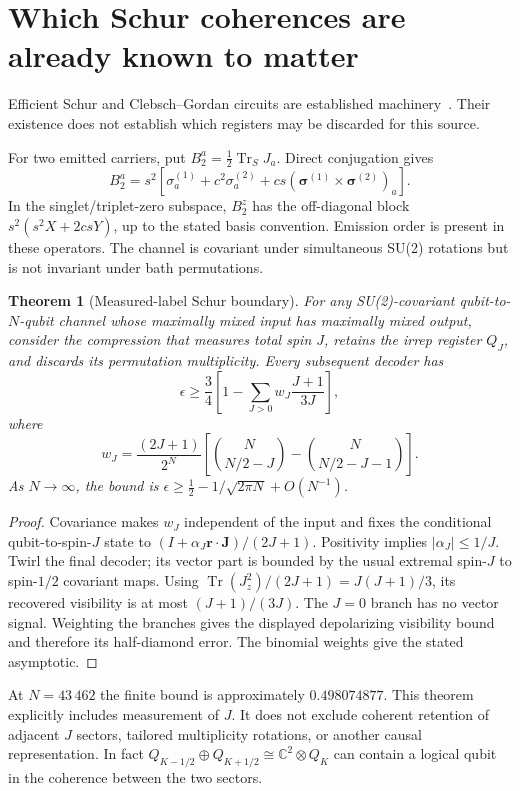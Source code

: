 \documentclass[11pt]{article}
\newtheorem{theorem}{Theorem}
\newcommand{\Tr}{\operatorname{Tr}}
\begin{document}
\section{Which Schur coherences are already known to matter}

Efficient Schur and Clebsch--Gordan circuits are established
machinery~\cite{bacon}. Their existence does not establish which registers may
be discarded for this source.

For two emitted carriers, put $B_2^a=\tfrac12\Tr_S J_a$. Direct conjugation gives
\begin{equation}
 B_2^a=s^2\left[\sigma_a^{(1)}+c^2\sigma_a^{(2)}
       +cs(\boldsymbol\sigma^{(1)}\times\boldsymbol\sigma^{(2)})_a\right].
 \label{eq:B2}
\end{equation}
In the singlet/triplet-zero subspace, $B_2^z$ has the off-diagonal block
$s^2(s^2X+2csY)$, up to the stated basis convention. Emission order is present
in these operators. The channel is covariant under simultaneous SU(2)
rotations but is not invariant under bath permutations.

\begin{theorem}[Measured-label Schur boundary]
For any SU(2)-covariant qubit-to-$N$-qubit channel whose maximally mixed input
has maximally mixed output, consider the compression that measures total spin
$J$, retains the irrep register $Q_J$, and discards its permutation
multiplicity. Every subsequent decoder has
\[
 \epsilon\ge\frac34\left[1-\sum_{J>0}w_J\frac{J+1}{3J}\right],
\]
where
\[
 w_J=\frac{(2J+1)}{2^N}
 \left[\binom N{N/2-J}-\binom N{N/2-J-1}\right].
\]
As $N\to\infty$, the bound is
$\epsilon\ge\tfrac12-1/\sqrt{2\pi N}+O(N^{-1})$.
\end{theorem}

\begin{proof}
Covariance makes $w_J$ independent of the input and fixes the conditional
qubit-to-spin-$J$ state to
$(I+\alpha_J\boldsymbol r\cdot\boldsymbol J)/(2J+1)$.
Positivity implies $|\alpha_J|\le1/J$. Twirl the final decoder; its vector
part is bounded by the usual extremal spin-$J$ to spin-$1/2$ covariant maps.
Using $\Tr(J_z^2)/(2J+1)=J(J+1)/3$, its recovered visibility is at most
$(J+1)/(3J)$. The $J=0$ branch has no vector signal. Weighting the branches
gives the displayed depolarizing visibility bound and therefore its
half-diamond error. The binomial weights give the stated asymptotic.
\end{proof}

At $N=43\,462$ the finite bound is approximately $0.498074877$.
This theorem explicitly includes measurement of $J$. It does not exclude
coherent retention of adjacent $J$ sectors, tailored multiplicity rotations,
or another causal representation. In fact
$Q_{K-1/2}\oplus Q_{K+1/2}\cong\mathbb C^2\otimes Q_K$ can contain a
logical qubit in the coherence between the two sectors.
\end{document}
